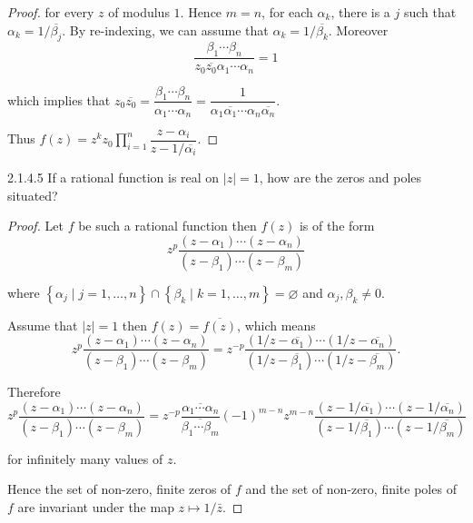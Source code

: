 \begin{proof}
	for every \( z \) of modulus \( 1 \). Hence \( m = n \),  for each \( \alpha_{k} \), there is a \( j \) such that \( \alpha_{k} = 1/\overline{\beta_{j}} \). By re-indexing, we can assume that \( \alpha_{k} = 1/\overline{\beta_{k}} \). Moreover
	\[
		\dfrac{\beta_{1} \cdots \beta_{n}}{z_{0}\overline{z_{0}} \alpha_{1} \cdots \alpha_{n}} = 1
	\]

	which implies that \( z_{0}\overline{z_{0}} = \dfrac{\beta_{1} \cdots \beta_{n}}{\alpha_{1} \cdots \alpha_{n}} = \dfrac{1}{\alpha_{1}\overline{\alpha_{1}} \cdots \alpha_{n}\overline{\alpha_{n}}} \).

	Thus \( f(z) = \displaystyle{z^{k}} z_{0} \prod^{n}_{i=1} \dfrac{z - \alpha_{i}}{z - 1/\overline{\alpha_{i}}} \).
\end{proof}

\begin{problem}{2.1.4.5}
If a rational function is real on \( |z| = 1 \), how are the zeros and poles situated?
\end{problem}

\begin{proof}
	Let \( f \) be such a rational function then \( f(z) \) is of the form
	\[
		z^{p}\dfrac{(z - \alpha_{1}) \cdots (z - \alpha_{n})}{(z - \beta_{1})\cdots (z - \beta_{m})}
	\]

	where \( \left\{ \alpha_{j} \mid j = 1, \ldots, n \right\} \cap \left\{ \beta_{k} \mid k = 1, \ldots, m \right\} = \varnothing \) and \( \alpha_{j}, \beta_{k} \ne 0 \).

	Assume that \( \left\vert z \right\vert = 1 \) then \( f(z) = \overline{f(z)} \), which means
	\[
		z^{p}\dfrac{(z - \alpha_{1}) \cdots (z - \alpha_{n})}{(z - \beta_{1})\cdots (z - \beta_{m})} = z^{-p} \dfrac{(1/z - \overline{\alpha_{1}}) \cdots (1/z - \overline{\alpha_{n}})}{(1/z - \overline{\beta_{1}}) \cdots (1/z - \overline{\beta_{m}})}.
	\]

	Therefore
	\[
		z^{p}\dfrac{(z - \alpha_{1}) \cdots (z - \alpha_{n})}{(z - \beta_{1})\cdots (z - \beta_{m})} = z^{-p} \dfrac{\overline{\alpha_{1} \cdots \alpha_{n}}}{\overline{\beta_{1}\cdots \beta_{m}}} {(-1)}^{m-n} z^{m-n} \dfrac{(z - 1/\overline{\alpha_{1}}) \cdots (z - 1/\overline{\alpha_{n}})}{(z - 1/\overline{\beta_{1}}) \cdots (z - 1/\overline{\beta_{m}})}
	\]

	for infinitely many values of \( z \).

	Hence the set of non-zero, finite zeros of \( f \) and the set of non-zero, finite poles of \( f \) are invariant under the map \( z \mapsto 1/\bar{z} \).
\end{proof}

